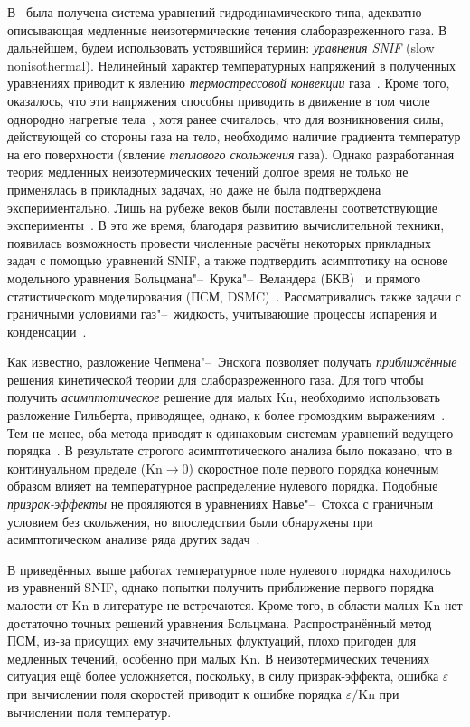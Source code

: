 \documentclass[10pt]{article}
\newcommand{\Kn}{\mathrm{Kn}}
\begin{document}
В~\cite{Kogan1970} была получена система уравнений гидродинамического типа,
адекватно описывающая медленные неизотермические течения слаборазреженного газа.
В дальнейшем, будем использовать устоявшийся термин: \emph{уравнения SNIF} (slow nonisothermal).
Нелинейный характер температурных напряжений в полученных уравнениях приводит к
явлению \emph{термострессовой конвекции} газа~\cite{Kogan1971}.
Кроме того, оказалось, что эти напряжения способны приводить в движение в том числе однородно нагретые тела~\cite{Friedlander1974},
хотя ранее считалось, что для возникновения силы, действующей со стороны газа на тело,
необходимо наличие градиента температур на его поверхности (явление \emph{теплового скольжения} газа).
Однако разработанная теория медленных неизотермических течений долгое время не только не применялась
в прикладных задачах, но даже не была подтверждена экспериментально.
Лишь на рубеже веков были поставлены соответствующие эксперименты~\cite{Friedlander1997, Friedlander2003}.
В это же время, благодаря развитию вычислительной техники, появилась возможность провести численные расчёты
некоторых прикладных задач с помощью уравнений SNIF, а также подтвердить асимптотику на основе модельного уравнения
Больцмана"--~Крука"--~Веландера (БКВ)~\cite{Alexandrov2002, Aoki2006, Alexandrov2008b, Alexandrov2011}
и прямого статистического моделирования (ПСМ, DSMC)~\cite{Alexandrov2008a, Aoki2007}.
Рассматривались также задачи с граничными условиями газ"--~жидкость,
учитывающие процессы испарения и конденсации~\cite{Aoki2007}.

Как известно, разложение Чепмена"--~Энскога позволяет получать \emph{приближённые} решения кинетической теории
для слаборазреженного газа. Для того чтобы получить \emph{асимптотическое} решение для малых \(\Kn\),
необходимо использовать разложение Гильберта, приводящее, однако, к более громоздким выражениям~\cite{Sone2002}.
Тем не менее, оба метода приводят к одинаковым системам уравнений ведущего порядка~\cite{Sone1996}.
В результате строгого асимптотического анализа было показано, что в континуальном пределе (\(\Kn\to0\))
скоростное поле первого порядка конечным образом влияет на температурное распределение нулевого порядка.
Подобные \emph{призрак-эффекты} не прояляются в уравнениях Навье"--~Стокса с граничным условием без скольжения,
но впоследствии были обнаружены при асимптотическом анализе ряда других задач~\cite{Sone2007}.

В приведённых выше работах температурное поле нулевого порядка находилось из уравнений SNIF,
однако попытки получить приближение первого порядка малости от \(\Kn\) в литературе не встречаются.
Кроме того, в области малых \(\Kn\) нет достаточно точных решений уравнения Больцмана.
Распространённый метод ПСМ, из-за присущих ему значительных флуктуаций, плохо пригоден
для медленных течений, особенно при малых \(\Kn\). В неизотермических течениях ситуация
ещё более усложняется, поскольку, в силу призрак-эффекта, ошибка \(\varepsilon\)
при вычислении поля скоростей приводит к ошибке порядка \(\varepsilon/\Kn\) при вычислении поля температур.
\end{document}
